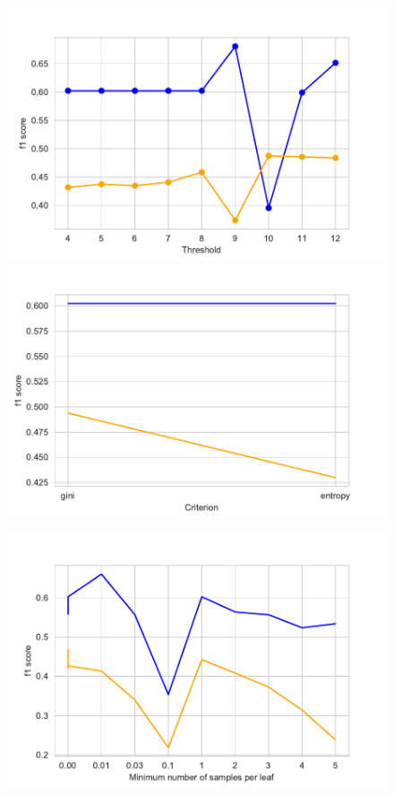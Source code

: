 \documentclass[11pt]{article}
\begin{document}
\begin{figure}[h]
\begin{minipage}[l]{0.33\textwidth}
\includegraphics[width=1\linewidth]{bridges/thresholds_rdf.pdf}
\end{minipage}
\begin{minipage}[l]{0.33\textwidth}
\includegraphics[width=1\linewidth]{bridges/criterion_rdf.pdf}
\end{minipage}
\begin{minipage}[l]{0.33\textwidth}
\includegraphics[width=1\linewidth]{bridges/min_samples_leaf_rdf.pdf}\\

\end{minipage}
\end{figure}
\end{document}
